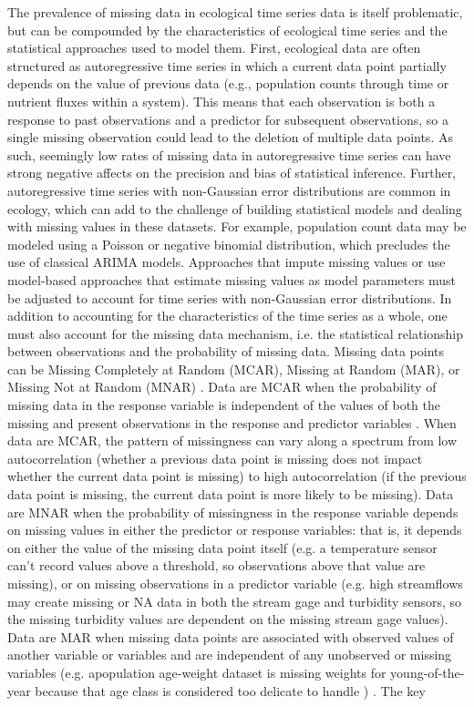 \documentclass{article}
\begin{document}
\begin{linenumbers}
The prevalence of missing data in ecological time series data is itself problematic, but can be compounded by the characteristics of ecological time series and the statistical approaches used to model them. First, ecological data are often structured as autoregressive time series in which a current data point partially depends on the value of previous data (e.g., population counts through time or nutrient fluxes within a system).  This means that each observation is both a response to past observations and a predictor for subsequent observations, so a single missing observation could lead to the deletion of multiple data points. As such, seemingly low rates of missing data in autoregressive time series can have strong negative affects on the precision and bias of statistical inference. Further, autoregressive time series with non-Gaussian error distributions are common in ecology, which can add to the challenge of building statistical models and dealing with missing values in these datasets. For example, population count data may be modeled using a Poisson or negative binomial distribution, which precludes the use of classical ARIMA models. Approaches that impute missing values or use model-based approaches that estimate missing values as model parameters must be adjusted to account for time series with non-Gaussian error distributions. In addition to accounting for the characteristics of the time series as a whole, one must also account for the missing data mechanism, i.e. the statistical relationship between observations and the probability of missing data. Missing data points can be Missing Completely at Random (MCAR), Missing at Random (MAR), or Missing Not at Random (MNAR) \citep[][Fig. \ref{fig:missingtypes}]{rubin_inference_1976, nakagawa_missing_2015}. Data are MCAR when the probability of missing data in the response variable is independent of the values of both the missing and present observations in the response and predictor variables \citep{nakagawa_missing_2015, horton2007much}. When data are MCAR, the pattern of missingness can vary along a spectrum from low autocorrelation (whether a previous data point is missing does not impact whether the current data point is missing) to high autocorrelation (if the previous data point is missing, the current data point is more likely to be missing). Data are MNAR when the probability of missingness in the response variable depends on missing values in either the predictor or response variables: that is, it depends on either the value of the missing data point itself (e.g. a temperature sensor can't record values above a threshold, so observations above that value are missing), or on missing observations in a predictor variable (e.g.  high streamflows may create missing or NA data in both the stream gage and turbidity sensors, so the missing turbidity values are dependent on the missing stream gage values). Data are MAR when missing data points are associated with observed values of another variable or  variables and are independent of any unobserved or missing variables (e.g. apopulation age-weight dataset is  missing weights for  young-of-the-year because that age class is considered  too delicate to handle )  \citep{newman_missing_2014, ellington_using_2015, nakagawa_missing_2015}. The key 
\end{linenumbers}
\end{document}

